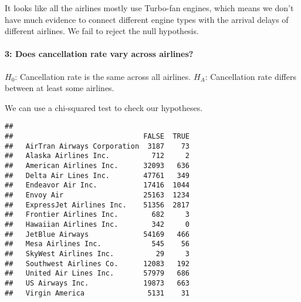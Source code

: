 \documentclass[
]{article}
\newenvironment{Shaded}{\begin{snugshade}}{\end{snugshade}}
\newcommand{\AttributeTok}[1]{\textcolor[rgb]{0.13,0.29,0.53}{#1}}
\newcommand{\FunctionTok}[1]{\textcolor[rgb]{0.13,0.29,0.53}{\textbf{#1}}}
\newcommand{\NormalTok}[1]{#1}
\newcommand{\OtherTok}[1]{\textcolor[rgb]{0.56,0.35,0.01}{#1}}
\newcommand{\SpecialCharTok}[1]{\textcolor[rgb]{0.81,0.36,0.00}{\textbf{#1}}}
\newcommand{\StringTok}[1]{\textcolor[rgb]{0.31,0.60,0.02}{#1}}
\begin{document}
It looks like all the airlines mostly use Turbo-fan engines, which means
we don't have much evidence to connect different engine types with the
arrival delays of different airlines. We fail to reject the null
hypothesis.

\paragraph{3: Does cancellation rate vary across
airlines?}\label{does-cancellation-rate-vary-across-airlines}

\(H_0\): Cancellation rate is the same across all airlines. \(H_A\):
Cancellation rate differs between at least some airlines.

We can use a chi-squared test to check our hypotheses.

\begin{Shaded}
\end{Shaded}

\begin{verbatim}
##                              
##                               FALSE  TRUE
##   AirTran Airways Corporation  3187    73
##   Alaska Airlines Inc.          712     2
##   American Airlines Inc.      32093   636
##   Delta Air Lines Inc.        47761   349
##   Endeavor Air Inc.           17416  1044
##   Envoy Air                   25163  1234
##   ExpressJet Airlines Inc.    51356  2817
##   Frontier Airlines Inc.        682     3
##   Hawaiian Airlines Inc.        342     0
##   JetBlue Airways             54169   466
##   Mesa Airlines Inc.            545    56
##   SkyWest Airlines Inc.          29     3
##   Southwest Airlines Co.      12083   192
##   United Air Lines Inc.       57979   686
##   US Airways Inc.             19873   663
##   Virgin America               5131    31
\end{verbatim}
\end{document}
